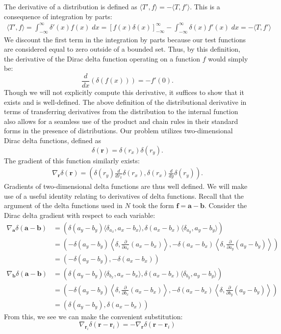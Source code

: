 \documentclass{article}
\begin{document}
The derivative of a distribution is defined as $\langle T',f\rangle=-\langle T,f'\rangle$. This is a consequence of integration by parts:
\begin{eqnarray*}
\langle T',f\rangle=\int_{-\infty}^\infty \delta'(x)f(x)\;dx=\left[f(x)\delta(x)\right]_{-\infty}^\infty-\int_{-\infty}^\infty \delta(x)f'(x)\;dx=-\langle T,f'\rangle
\end{eqnarray*}We discount the first term in the integration by parts because our test functions are considered equal to zero outside of a bounded set. Thus, by this definition, the derivative of the Dirac delta function operating on a function $f$ would simply be:
\[\frac{d}{dx}(\delta(f(x)))=-f'(0).
\]Though we will not explicitly compute this derivative, it suffices to show that it exists and is well-defined. The above definition of the distributional derivative in terms of transferring derivatives from the distribution to the internal function also allows for a seamless use of the product and chain rules in their standard forms in the presence of distributions.  Our problem utilizes two-dimensional Dirac delta functions, defined as
\[\delta(\mathbf{r})=\delta(r_x)\delta(r_y).
\]The gradient of this function similarly exists:
\begin{eqnarray*}
\nabla_\mathbf{r}\delta(\mathbf{r})=\left(\delta(r_y)\frac{d}{dr_x}\delta(r_x),\delta(r_x)\frac{d}{dy}\delta(r_y)\right).
\end{eqnarray*}Gradients of two-dimensional delta functions are thus well defined. We will make use of a useful identity relating to derivatives of delta functions. Recall that the argument of the delta functions used in $N$ took the form $\mathbf{f}=\mathbf{a}-\mathbf{b}$. Consider the Dirac delta gradient with respect to each variable:
\begin{align*}
\nabla_\mathbf{a}\delta(\mathbf{a}-\mathbf{b})&=\left(\delta(a_y-b_y)\langle \delta_{a_x},a_x-b_x\rangle,\delta(a_x-b_x)\langle \delta_{a_y},a_y-b_y\rangle\right)\\
&=\left(-\delta(a_y-b_y)\left\langle\delta,\frac{\partial}{\partial a_x}(a_x-b_x)\right\rangle,-\delta(a_x-b_x)\left\langle\delta,\frac{\partial}{\partial a_y}(a_y-b_y)\right\rangle\right)\\
&=(-\delta(a_y-b_y),-\delta(a_x-b_x))\\
\nabla_\mathbf{b}\delta(\mathbf{a}-\mathbf{b})&=\left(\delta(a_y-b_y)\langle \delta_{b_x},a_x-b_x\rangle,\delta(a_x-b_x)\langle \delta_{b_y},a_y-b_y\rangle\right)\\
&=\left(-\delta(a_y-b_y)\left\langle\delta,\frac{\partial}{\partial b_x}(a_x-b_x)\right\rangle,-\delta(a_x-b_x)\left\langle\delta,\frac{\partial}{\partial b_y}(a_y-b_y)\right\rangle\right)\\
&=(\delta(a_y-b_y),\delta(a_x-b_x))
\end{align*}From this, we see we can make the convenient substitution:
\begin{equation}
\nabla_{\mathbf{r}_i}\delta(\mathbf{r}-\mathbf{r}_i)=-\nabla_\mathbf{r}\delta(\mathbf{r}-\mathbf{r}_i)\label{delderivswitch}
\end{equation}
\end{document}
